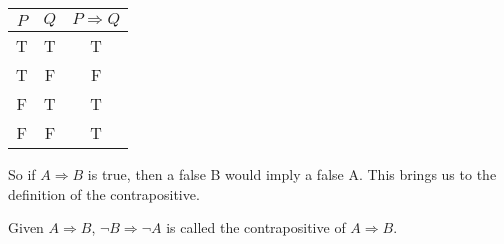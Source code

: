 \begin{center}
	\begin{tabular}{cc|c}
		$P$ & $Q$ & $P \Rightarrow Q$ \\
		\hline
		T & T & T \\
		T & F & F \\
		F & T & T \\
		F & F & T \\
	\end{tabular}
\end{center}

So if $A \Rightarrow B$ is true, then a false B would imply a false A.
This brings us to the definition of the contrapositive.

\begin{defn}
	Given $A \Rightarrow B$, $\neg B \Rightarrow \neg A$ is called the contrapositive of $A \Rightarrow B$.
\end{defn}



